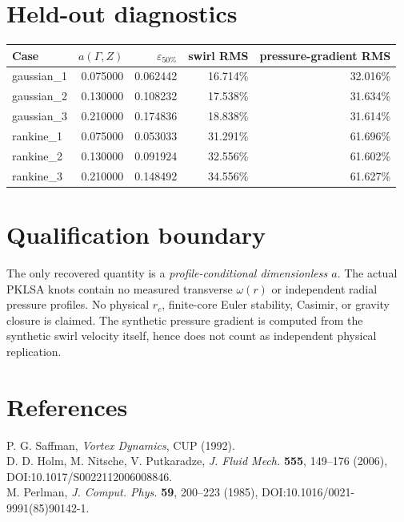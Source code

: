 \documentclass[11pt,a4paper]{article}
\begin{document}
\section{Held-out diagnostics}
\small\begin{longtable}{lrrrr}\toprule Case & $a(\Gamma,Z)$ & $\varepsilon_{50\%}$ & swirl RMS & pressure-gradient RMS\\\midrule\endhead
gaussian\_1 & 0.075000 & 0.062442 & 16.714\% & 32.016\% \\
gaussian\_2 & 0.130000 & 0.108232 & 17.538\% & 31.634\% \\
gaussian\_3 & 0.210000 & 0.174836 & 18.838\% & 31.614\% \\
rankine\_1 & 0.075000 & 0.053033 & 31.291\% & 61.696\% \\
rankine\_2 & 0.130000 & 0.091924 & 32.556\% & 61.602\% \\
rankine\_3 & 0.210000 & 0.148492 & 34.556\% & 61.627\% \\
\bottomrule\end{longtable}\normalsize
\section{Qualification boundary}
The only recovered quantity is a \emph{profile-conditional dimensionless $a$}. The actual PKLSA knots contain no measured transverse $\omega(r)$ or independent radial pressure profiles. No physical $r_c$, finite-core Euler stability, Casimir, or gravity closure is claimed. The synthetic pressure gradient is computed from the synthetic swirl velocity itself, hence does not count as independent physical replication.
\section{References}
P. G. Saffman, \emph{Vortex Dynamics}, CUP (1992).\\
D. D. Holm, M. Nitsche, V. Putkaradze, \emph{J. Fluid Mech.} \textbf{555}, 149--176 (2006), DOI:10.1017/S0022112006008846.\\
M. Perlman, \emph{J. Comput. Phys.} \textbf{59}, 200--223 (1985), DOI:10.1016/0021-9991(85)90142-1.
\end{document}
